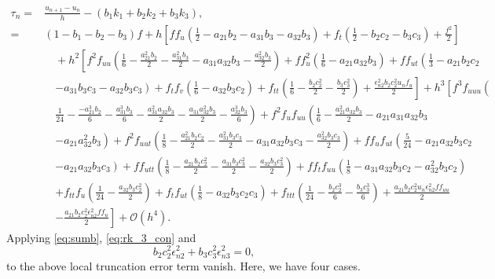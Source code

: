 \documentclass[a4paper, preprint,11pt]{elsarticle}
\numberwithin{equation}{section}
\begin{document}
\begin{align*}
    \tau_n  = & \frac{u_{n+1}-u_{n}}{h} - (b_1k_1 + b_2k_2 + b_3k_3),\\
      = & (1 -b_1-b_2-b_3)f + h\left[ff_u \left(\frac{1}{2} - a_{21}b_2 -a_{31}b_3 -a_{32}b_3\right) + f_t \left( \frac{1}{2} - b_2c_2 -b_3c_3\right) + \frac{f^2}{2}\right] \\
&\quad 
 +h^2\left[ f^2f_{uu}\left( \frac{1}{6} -\frac{a_{21}^2b_2}{2} - \frac{a_{31}^2b_3}{2} - a_{31}a_{32}b_3 - \frac{a_{32}^2b_3}{2}\right) + ff_u^2 \left( \frac{1}{6}-a_{21}a_{32}b_3\right)  + ff_{ut} \left( \frac{1}{3}-a_{21}b_2c_2 \right. \right.\\
 & \quad
 \left.\left.
 - a_{31}b_3c_3 - a_{32}b_3c_3\right) +f_tf_v\left( \frac{1}{6} - a_{32}b_3c_2\right) +f_{tt}\left( \frac{1}{6} - \frac{b_2c_2^2}{2} - \frac{b_3c_3^2}{2}\right) +\frac{\epsilon_{n2}^2b_2c_2^2u_nf_u}{2}
 \right] + h^3\left[f^3f_{uuu}\left( \right.\right.\\
 & \quad \left. \left.
 \frac{1}{24}-\frac{-a_{21}^3b_2}{6} - \frac{a_{31}^3b_3}{6} - \frac{a_{31}^2a_{32}b_3}{2} - \frac{a_{31}a_{32}^2b_3}{2} - \frac{a_{32}^3b_3}{6}\right) +f^2f_uf_{uu}\left( \frac{1}{6} - \frac{a_{21}^2a_{32}b_3}{2} - a_{21}a_{31}a_{32}b_3 \right.\right.\\
 & \quad \left.\left.
 - a_{21}a_{32}^2b_3\right) + f^2f_{uut} \left( \frac{1}{8}-\frac{a_{21}^2b_2c_2}{2} - \frac{a_{31}^2b_{3}c_3}{2} -a_{31}a_{32}b_3c_3 -\frac{a_{32}^2b_3c_3}{2} \right) + ff_uf_{ut}\left( \frac{5}{24} -a_{21}a_{32}b_3c_2 \right.\right.\\
 & \quad \left.\left. 
 -a_{21}a_{32}b_3c_3\right) +ff_{utt}\left( \frac{1}{8}-\frac{a_{21}b_2c_2^2}{2} - \frac{a_{31}b_3c_3^2}{2} -\frac{a_{32}b_3c_3^2}{2} \right) + ff_tf_{uu}\left( \frac{1}{8} -a_{31}a_{32}b_3c_2 -a_{32}^2b_3c_2\right)\right. \\
 & \quad \left.+ f_{tt}f_u\left( \frac{1}{24} -\frac{a_{32}b_3c_2^2}{2}\right) +f_tf_{ut}\left( \frac{1}{8} - a_{32}b_3c_2c_3\right) + f_{ttt}\left( \frac{1}{24} -\frac{b_2c_2^3}{6} - \frac{b_3c_3^3}{6}\right) + \frac{a_{21}b_2c_2^2u_n\epsilon_{n2}^2ff_{uu}}{2} \right.\\
 &\quad \left. -\frac{a_{21}b_2c_2^2\epsilon_{n2}^2ff_u}{2}\right]+\mathcal{O}(h^4).
\end{align*}
Applying  \eqref{eq:sumb}, \eqref{eq:rk_3_con} and 
\begin{equation*}
    b_2c_2^2\epsilon_{n2}^2 + b_3c_3^2\epsilon_{n3}^2 = 0,
 \end{equation*}
 to the above local truncation error term vanish. Here, we have four cases.
\end{document}
